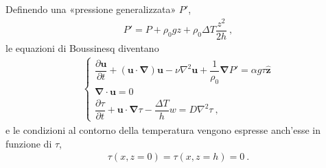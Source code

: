 \documentclass[letterpaper,10pt,italian]{jupyterBook}
\begin{document}
\sphinxAtStartPar
Definendo una «pressione generalizzata» \(P'\),
\begin{equation*}
\begin{split}P' = P + \rho_0 g z + \rho_0 \Delta T \dfrac{z^2}{2 h} \ ,\end{split}
\end{equation*}
\sphinxAtStartPar
le equazioni di Boussinesq diventano
\begin{equation*}
\begin{split}\label{eqn:Bouss-tau}
    \begin{cases}
      \dfrac{\partial \mathbf{u}}{\partial t} + 
      \left( \mathbf{u} \cdot \mathbf{\nabla} \right) \mathbf{u} -
      \nu \nabla^2 \mathbf{u} + \dfrac{1}{\rho_0}\mathbf{\nabla} P' = \alpha  g \tau \mathbf{\hat{z}} \\
      \mathbf{\nabla} \cdot \mathbf{u} = 0 \\
      \dfrac{\partial \tau}{\partial t} + \mathbf{u} \cdot 
      \mathbf{\nabla} \tau -\dfrac{\Delta T}{h} w =  D \nabla^2 \tau \ ,
    \end{cases}\end{split}
\end{equation*}
\sphinxAtStartPar
e le condizioni al contorno della temperatura vengono
espresse anch’esse in funzione di \(\tau\),
\begin{equation*}
\begin{split}\label{eqn:Bouss-tau-bc}
    \tau(x,z=0) = \tau(x,z=h) = 0 \ .\end{split}
\end{equation*}
\end{document}
